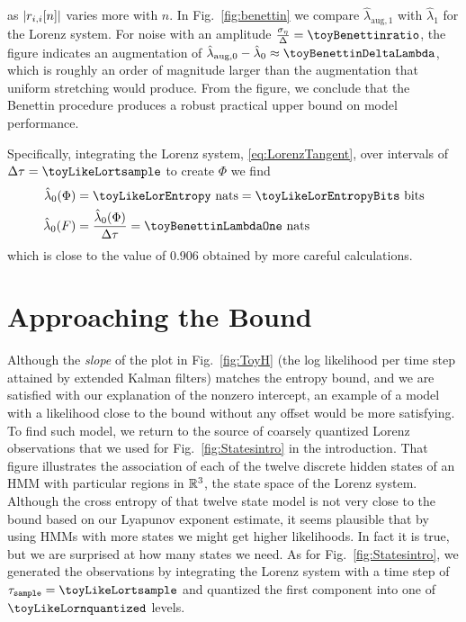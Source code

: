 as $ \left| {r_{i,i}}{[n]} \right|$ varies more with $n$.  In
Fig.~\ref{fig:benettin} we compare $\hat \lambda_{\text{aug},1}$ with
$\hat \lambda_{1}$ for the Lorenz system.  For noise with an amplitude
$\frac{\sigma_\eta}{\Delta} = \toyBenettinratio$, the figure indicates
an augmentation of
$\hat \lambda_{\text{aug},0} - \hat \lambda_{0} \approx
\toyBenettinDeltaLambda$, which is roughly an order of magnitude
larger than the augmentation that uniform stretching would produce.
From the figure, we conclude that the Benettin procedure produces a
robust practical upper bound on model performance.

Specifically, integrating the Lorenz system, \eqref{eq:LorenzTangent},
over intervals of $\Delta\tau= \toyLikeLortsample $ to create $\Phi$ we
find
\begin{align*}
  \hat \lambda_0(\Phi)  &= \toyLikeLorEntropy\text{ nats} =
                          \toyLikeLorEntropyBits\text{ bits} \\
  \hat \lambda_0(F) &= \frac{\hat \lambda_0(\Phi)}{\Delta\tau} =
                      \toyBenettinLambdaOne \text{ nats}
\end{align*}
which is close to the value of 0.906 obtained by more careful
calculations.

\section{Approaching the Bound}
\label{sec:approach}
\longpage%

Although the \emph{slope} of the plot in Fig.~\ref{fig:ToyH} (the log
likelihood per time step attained by extended Kalman filters) matches
the entropy bound, and we are satisfied with our explanation of the
nonzero intercept, an example of a model with a likelihood close to
the bound without any offset would be more satisfying.  To find such
model, we return to the source of coarsely quantized Lorenz
observations that we used for Fig.~\ref{fig:Statesintro} in the
introduction.  That figure illustrates the association of each of the
twelve discrete hidden states of an HMM with particular regions in
$\mathbb{R}^3$, the state space of the Lorenz system.  Although the cross
entropy of that twelve state model is not very close to the bound
based on our Lyapunov exponent estimate, it seems plausible that by
using HMMs with more states we might get higher likelihoods.  In fact
it is true, but we are surprised at how many states we need.  As for
Fig.~\ref{fig:Statesintro}, we generated the observations by
integrating the Lorenz system with a time step of
$\tau_{\mathtt{sample}}=\toyLikeLortsample$ and quantized the first
component into one of $\toyLikeLornquantized$ levels.


